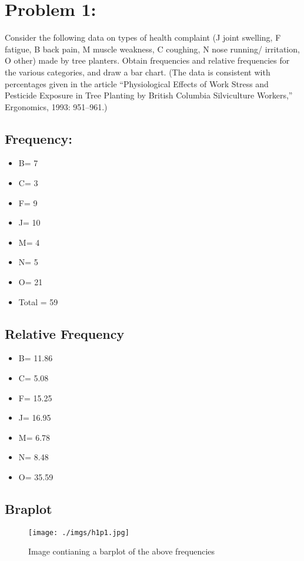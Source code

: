 \documentclass[11pt]{article}
\author{Denver Ellis}
\date{\today}
\title{}
\begin{document}
\tableofcontents

\section{Problem 1:}
\label{sec:org8e0957a}
Consider the following data on types of health complaint (J joint swelling, F fatigue, B back pain, M muscle weakness, C coughing, N nose running/ irritation, O other) made by tree planters. Obtain frequencies and relative frequencies for the various categories, and draw a bar chart. (The data is consistent with percentages given in the article “Physiological Effects of Work Stress and Pesticide Exposure in Tree Planting by British Columbia Silviculture Workers,” Ergonomics, 1993: 951–961.)

\subsection{Frequency:}
\label{sec:org71ff32d}
\begin{itemize}
\item B= 7
\item C= 3
\item F= 9
\item J= 10
\item M= 4
\item N= 5
\item O= 21
\item Total = 59
\end{itemize}

\subsection{Relative Frequency}
\label{sec:orga623ae8}
\begin{itemize}
\item B= 11.86
\item C= 5.08
\item F= 15.25
\item J= 16.95
\item M= 6.78
\item N= 8.48
\item O= 35.59
\end{itemize}

\subsection{Braplot}
\label{sec:org9596d1b}
\begin{figure}[htbp]
\centering
\texttt{[image: ./imgs/h1p1.jpg]}
\caption{\label{fig:org3170673}
Image contianing a barplot of the above frequencies}
\end{figure}
\end{document}
